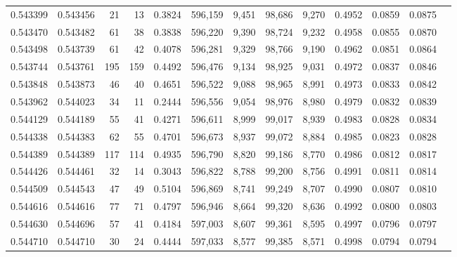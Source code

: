 \begin{tabular}{rrrrrrrrrrrrr}
0.543399 & 0.543456 &    21 &    13 &                                     0.3824 & 596,159 &   9,451 &  98,686 &   9,270 & 0.4952 & 0.0859 & 0.0875 \\
0.543470 & 0.543482 &    61 &    38 &                                     0.3838 & 596,220 &   9,390 &  98,724 &   9,232 & 0.4958 & 0.0855 & 0.0870 \\
0.543498 & 0.543739 &    61 &    42 &                                     0.4078 & 596,281 &   9,329 &  98,766 &   9,190 & 0.4962 & 0.0851 & 0.0864 \\
0.543744 & 0.543761 &   195 &   159 &                                     0.4492 & 596,476 &   9,134 &  98,925 &   9,031 & 0.4972 & 0.0837 & 0.0846 \\
0.543848 & 0.543873 &    46 &    40 &                                     0.4651 & 596,522 &   9,088 &  98,965 &   8,991 & 0.4973 & 0.0833 & 0.0842 \\
0.543962 & 0.544023 &    34 &    11 &                                     0.2444 & 596,556 &   9,054 &  98,976 &   8,980 & 0.4979 & 0.0832 & 0.0839 \\
0.544129 & 0.544189 &    55 &    41 &                                     0.4271 & 596,611 &   8,999 &  99,017 &   8,939 & 0.4983 & 0.0828 & 0.0834 \\
0.544338 & 0.544383 &    62 &    55 &                                     0.4701 & 596,673 &   8,937 &  99,072 &   8,884 & 0.4985 & 0.0823 & 0.0828 \\
0.544389 & 0.544389 &   117 &   114 &                                     0.4935 & 596,790 &   8,820 &  99,186 &   8,770 & 0.4986 & 0.0812 & 0.0817 \\
0.544426 & 0.544461 &    32 &    14 &                                     0.3043 & 596,822 &   8,788 &  99,200 &   8,756 & 0.4991 & 0.0811 & 0.0814 \\
0.544509 & 0.544543 &    47 &    49 &                                     0.5104 & 596,869 &   8,741 &  99,249 &   8,707 & 0.4990 & 0.0807 & 0.0810 \\
0.544616 & 0.544616 &    77 &    71 &                                     0.4797 & 596,946 &   8,664 &  99,320 &   8,636 & 0.4992 & 0.0800 & 0.0803 \\
0.544630 & 0.544696 &    57 &    41 &                                     0.4184 & 597,003 &   8,607 &  99,361 &   8,595 & 0.4997 & 0.0796 & 0.0797 \\
0.544710 & 0.544710 &    30 &    24 &                                     0.4444 & 597,033 &   8,577 &  99,385 &   8,571 & 0.4998 & 0.0794 & 0.0794 \\

\end{tabular}
